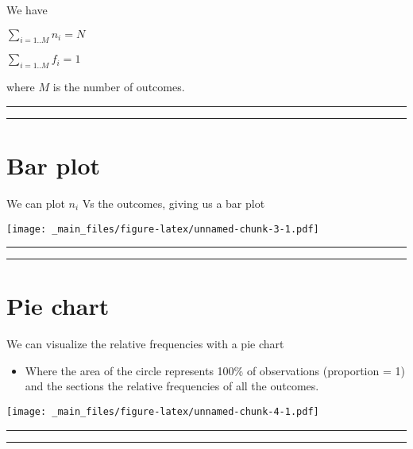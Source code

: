 \documentclass[
]{book}
\providecommand{\tightlist}{%
  \setlength{\itemsep}{0pt}\setlength{\parskip}{0pt}}
\begin{document}
We have

\(\sum_{i=1..M} n_i = N\)

\(\sum_{i=1..M} f_i = 1\)

where \(M\) is the number of outcomes.

\begin{center}\rule{0.5\linewidth}{0.5pt}\end{center}

\begin{center}\rule{0.5\linewidth}{0.5pt}\end{center}

\hypertarget{bar-plot}{%
\section{Bar plot}\label{bar-plot}}

We can plot \(n_i\) Vs the outcomes, giving us a bar plot

\texttt{[image: \_main\_files/figure-latex/unnamed-chunk-3-1.pdf]}

\begin{center}\rule{0.5\linewidth}{0.5pt}\end{center}

\begin{center}\rule{0.5\linewidth}{0.5pt}\end{center}

\hypertarget{pie-chart}{%
\section{Pie chart}\label{pie-chart}}

We can visualize the relative frequencies with a pie chart

\begin{itemize}
\tightlist
\item
  Where the area of the circle represents 100\% of observations (proportion = 1) and the sections the relative frequencies of all the outcomes.
\end{itemize}

\texttt{[image: \_main\_files/figure-latex/unnamed-chunk-4-1.pdf]}

\begin{center}\rule{0.5\linewidth}{0.5pt}\end{center}

\begin{center}\rule{0.5\linewidth}{0.5pt}\end{center}
\end{document}
